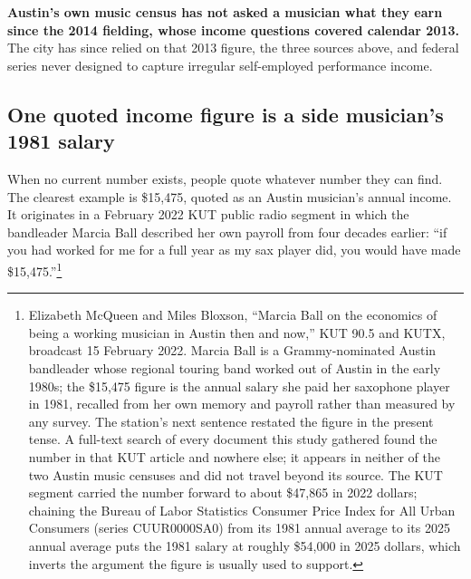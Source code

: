 \textbf{Austin's own music census has not asked a musician what they earn since
the 2014 fielding, whose income questions covered calendar 2013.} The city has
since relied on that 2013 figure, the three sources above, and federal series
never designed to capture irregular self-employed performance income.

\subsection{One quoted income figure is a side musician's 1981 salary}

When no current number exists, people quote whatever number they can find. The
clearest example is \$15,475, quoted as an Austin musician's annual income. It
originates in a February 2022 KUT public radio segment in which the bandleader
Marcia Ball described her own payroll from four decades earlier: ``if you had
worked for me for a full year as my sax player did, you would have made
\$15,475.''\footnote{Elizabeth McQueen and Miles Bloxson, ``Marcia Ball on the
economics of being a working musician in Austin then and now,'' KUT 90.5 and
KUTX, broadcast 15 February 2022. Marcia Ball is a Grammy-nominated Austin
bandleader whose regional touring band worked out of Austin in the early 1980s;
the \$15,475 figure is the annual salary she paid her saxophone player in 1981,
recalled from her own memory and payroll rather than measured by any survey.
The station's next sentence restated the figure in the present tense. A
full-text search of every document this study gathered found the number in
that KUT article and nowhere else; it appears in neither of the two Austin
music censuses and did not travel beyond its source. The KUT segment carried the number
forward to about \$47,865 in 2022 dollars; chaining the Bureau of Labor
Statistics Consumer Price Index for All Urban Consumers (series
CUUR0000SA0) from its 1981 annual average to its 2025 annual average puts the
1981 salary at roughly \$54,000 in 2025 dollars, which inverts the argument
the figure is usually used to support.}

